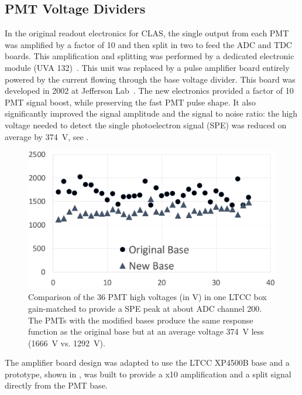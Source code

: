 \subsection{PMT Voltage Dividers}

In the original readout electronics for CLAS, the single output from each PMT was amplified by a factor of 10
and then split in two to feed the ADC and TDC boards. This amplification and splitting was performed
by a dedicated electronic module (UVA 132)~\cite{Adams:2001kk}. This unit was replaced by a pulse amplifier board
entirely powered by the current flowing through the base voltage divider. This board was developed in 2002 at
Jefferson Lab~\cite{Popov:2003mj}.
The new electronics provided a factor of 10 PMT signal boost, while preserving the fast PMT pulse shape.
It also significantly improved the signal amplitude and the signal to noise ratio: the high voltage needed to detect
the single photoelectron signal (SPE) was reduced on average by 374~V, see .

\begin{figure}
	\centering
	\includegraphics[width=0.99\columnwidth,keepaspectratio]{img/pmtHVImprovement.png}
	\caption{Comparison of the 36 PMT high voltages (in V) in one LTCC box gain-matched to provide a SPE peak at about
          ADC channel 200. The PMTs with the modified bases produce the same response function as the original
			base but at an average voltage 374~V less (1666~V vs. 1292~V).}
	\label{fig:pmtHVImprovement}
\end{figure}

The amplifier board design was adapted to use the LTCC XP4500B base and a prototype, shown in , was built to provide a x10
amplification and a split signal directly from the PMT base.


